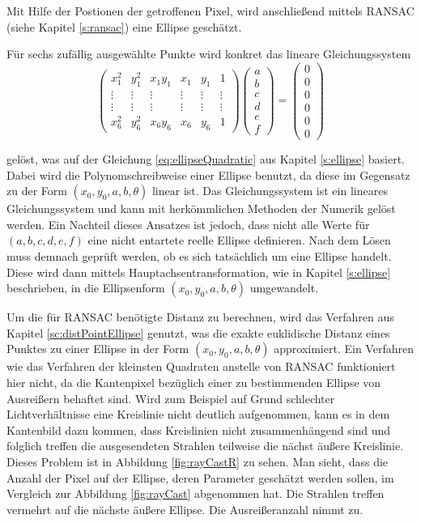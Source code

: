 Mit Hilfe der Postionen der getroffenen Pixel, wird anschließend mittels RANSAC (siehe Kapitel \ref{s:ransac}) eine Ellipse geschätzt.

Für sechs zufällig ausgewählte Punkte wird konkret das lineare Gleichungssystem
\[
\begin{pmatrix}
x_1^2 & y_1^2 & x_1y_1 & x_1 & y_1 & 1\\
\vdots &\vdots & \vdots & \vdots &\vdots & \vdots\\
\vdots &\vdots & \vdots & \vdots &\vdots & \vdots\\
x_6^2 & y_6^2 & x_6y_6 & x_6 & y_6 & 1
\end{pmatrix} \begin{pmatrix}
a \\ b \\ c \\ d \\ e \\ f
\end{pmatrix} = \begin{pmatrix}
0 \\ 0 \\ 0 \\ 0 \\ 0 \\ 0
\end{pmatrix}
\]

gelöst, was auf der Gleichung \ref{eq:ellipseQuadratic} aus Kapitel \ref{s:ellipse} basiert. Dabei wird die Polynomschreibweise einer Ellipse benutzt, da diese im Gegensatz zu der Form $(x_0,y_0,a,b,\theta)$ linear ist. Das Gleichungssystem ist ein lineares Gleichungssystem und kann mit herkömmlichen Methoden der Numerik gelöst werden. Ein Nachteil dieses Ansatzes ist jedoch, dass nicht alle Werte für $(a,b,c,d,e,f)$ eine nicht entartete reelle Ellipse definieren. Nach dem Lösen muss demnach geprüft werden, ob es sich tatsächlich um eine Ellipse handelt.
Diese wird dann mittels Hauptachsentransformation, wie in Kapitel \ref{s:ellipse} beschrieben, in die Ellipsenform $(x_0,y_0,a,b,\theta)$ umgewandelt.

Um die für RANSAC benötigte Distanz zu berechnen, wird das Verfahren aus Kapitel \ref{sc:distPointEllipse} genutzt, was die exakte euklidische Distanz eines Punktes zu einer Ellipse in der Form $(x_0,y_0,a,b,\theta)$ approximiert.
Ein Verfahren wie das Verfahren der kleinsten Quadraten anstelle von RANSAC funktioniert hier nicht, da die Kantenpixel bezüglich einer zu bestimmenden Ellipse von Ausreißern behaftet sind. Wird zum Beispiel auf Grund schlechter Lichtverhältnisse eine Kreislinie nicht deutlich aufgenommen, kann es in dem Kantenbild dazu kommen, dass Kreislinien nicht zusammenhängend sind und folglich treffen die ausgesendeten Strahlen teilweise die nächst äußere Kreislinie. Dieses Problem ist in Abbildung \ref{fig:rayCastR} zu sehen. Man sieht, dass die Anzahl der Pixel auf der Ellipse, deren Parameter geschätzt werden sollen, im Vergleich zur Abbildung \ref{fig:rayCast} abgenommen hat. Die Strahlen treffen vermehrt auf die nächste äußere Ellipse. Die Ausreißeranzahl nimmt zu.


